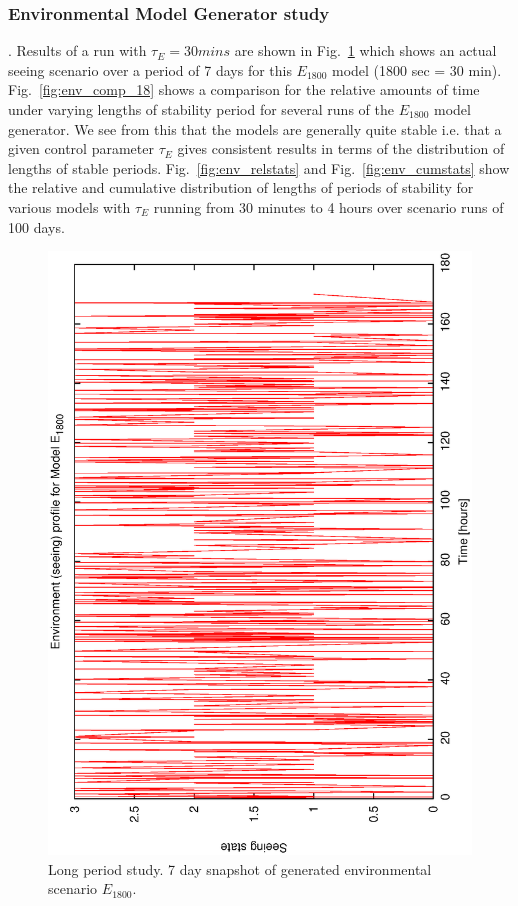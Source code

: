 \subsubsection{Environmental Model Generator study}
. Results of a run with $\tau_E =30 mins$ are shown in Fig.~\ref{fig:env_profile_18} which shows an actual seeing scenario over a period of 7 days for this $E_{1800}$ model (1800 sec = 30 min). Fig.~\ref{fig:env_comp_18} shows a comparison for the relative amounts of time under varying lengths of stability period for several runs of the $E_{1800}$ model generator. We see from this that the models are generally quite stable i.e. that a given control parameter $\tau_E$ gives consistent results in terms of the distribution of lengths of stable periods. Fig.~\ref{fig:env_relstats} and  Fig.~\ref{fig:env_cumstats} show the relative and cumulative distribution of lengths of periods of stability for various models with $\tau_E$ running from 30 minutes to 4 hours over scenario runs of 100 days.


\begin{figure}[h]
\begin{center}
 \includegraphics[scale=0.5, angle=-90]{figures/e_18_prof.eps}
\end{center} 
 \caption[Environmental scenario (7 day snapshot).] 
   {Long period study. 7 day snapshot of generated environmental scenario $E_{1800}$.}
\label{fig:env_profile_18}
\end{figure}


